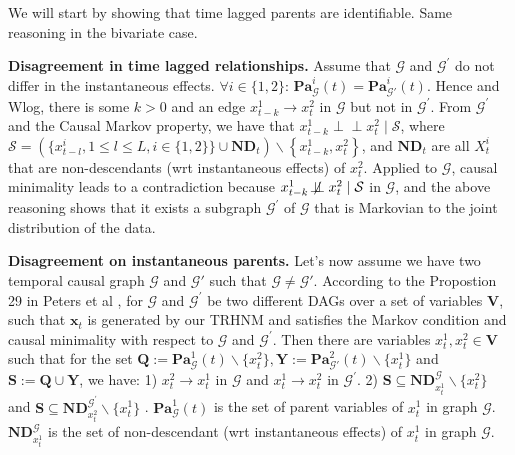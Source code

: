 We will start by showing that time lagged parents are identifiable. Same reasoning in the bivariate case.

\textbf{Disagreement in time lagged relationships. } Assume that $\mathcal{G}$ and $\mathcal{G}^{\prime}$ do not differ in the instantaneous effects. $\forall i \in \{1,2\}$: $\mathbf{P a}_{\mathcal{G}}^i(t) = \mathbf{P a}_{\mathcal{G}'}^i(t)$. 
Hence and Wlog, there is some $k>0$ and an edge $x_{t-k}^1 \rightarrow x_t^2$ in $\mathcal{G}$ but not in $\mathcal{G}^{\prime}$. From $\mathcal{G}^{\prime}$ and the Causal Markov property, we have that $x_{t-k}^1 \perp\!\!\!\perp x_t^2 \mid \mathcal{S}$, where $\mathcal{S}=(\{x_{t-l}^i, 1 \leq l \leq L,  i \in \{1,2\}\} \cup \mathbf{N D}_t) \backslash\left\{x_{t-k}^1, x_t^2\right\}$, and $\mathbf{N D}_t$ are all $X_t^i$ that are non-descendants (wrt instantaneous effects) of $x_t^2$. Applied to $\mathcal{G}$, causal minimality leads to a contradiction because $x_{t-k}^1 \not\!\perp\!\!\!\perp x_t^2 \mid \mathcal{S}$ in $\mathcal{G}$, and the above reasoning shows that it exists a subgraph $\mathcal{G}^{\prime}$ of $\mathcal{G}$ that is Markovian to the joint distribution of the data.

\textbf{Disagreement on instantaneous parents. }Let's now assume we have two temporal causal graph $\mathcal{G}$ and $ \mathcal{G}'$ such that $\mathcal{G} \neq \mathcal{G}'$. According to the Propostion 29 in Peters et al \citep{peters2014causal}, for $\mathcal{G}$ and $\mathcal{G}^{\prime}$ be two different DAGs over a set of variables $\boldsymbol{V}$, such that $\boldsymbol{x}_t$ is generated by our TRHNM and satisfies the Markov condition and causal minimality with respect to $\mathcal{G}$ and $\mathcal{G}^{\prime}$. Then there are variables $x_t^1, x_t^2 \in \boldsymbol{V}$ such that for the set $\boldsymbol{Q}:= \mathbf{P a}_{\mathcal{G}}^1(t) \backslash\{x_t^2\}, \boldsymbol{Y}:=\mathbf{P a}_{\mathcal{G}'}^2(t)  \backslash\{x_t^1\}$ and $\boldsymbol{S}:=\boldsymbol{Q} \cup \boldsymbol{Y}$, we have: 1) $ x_t^2\rightarrow x_t^1$ in $\mathcal{G}$ and $x_t^1 \rightarrow x_t^2$ in $\mathcal{G}^{\prime}$. 2) $\boldsymbol{S} \subseteq \mathbf{N D}_{x_t^1}^{\mathcal{G}} \backslash\{x_t^2\}$ and $\boldsymbol{S} \subseteq \mathbf{N D}_{x_t^2}^{\mathcal{G}^{\prime}} \backslash\{x_t^1\}$ . $\mathbf{P a}_{\mathcal{G}}^1(t)$ is the set of parent variables of $x_t^1$ in graph $\mathcal{G}$. $\mathbf{N D}{ }_{x_t^1}^{\mathcal{G}}$ is the set of non-descendant (wrt instantaneous effects) of $x_t^1$ in graph $\mathcal{G}$.

